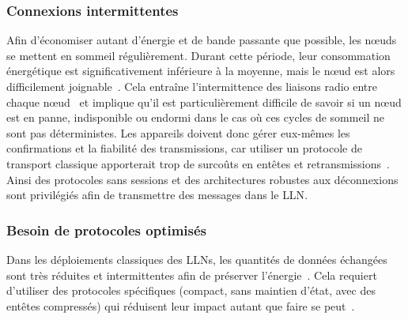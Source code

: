 \subsubsection{Connexions intermittentes}

Afin d'économiser autant d'énergie et de bande passante que possible, les nœuds se mettent en sommeil régulièrement.
Durant cette période, leur consommation énergétique est significativement inférieure à la moyenne, mais le nœud est alors difficilement joignable~\cite{kellner2008towards}.
Cela entraîne l'intermittence des liaisons radio entre chaque nœud~\cite{duarte2002analysis} et implique qu'il est particulièrement difficile de savoir si un nœud est en panne, indisponible ou endormi dans le cas où ces cycles de sommeil ne sont pas déterministes.
Les appareils doivent donc gérer eux-mêmes les confirmations et la fiabilité des transmissions, car utiliser un protocole de transport classique apporterait trop de surcoûts en entêtes et retransmissions~\cite{rfc7252}.
Ainsi des protocoles sans sessions et des architectures robustes aux déconnexions sont privilégiés afin de transmettre des messages dans le \ac{LLN}.


\subsubsection{Besoin de protocoles optimisés}

Dans les déploiements classiques des \ac{LLN}s, les quantités de données échangées sont très réduites et intermittentes afin de préserver l'énergie~\cite{tan2010future}.
Cela requiert d'utiliser des protocoles spécifiques (compact, sans maintien d'état, avec des entêtes compressés) qui réduisent leur impact autant que faire se peut~\cite{Winter2012,shelby20116lowpan,rfc6690}.

